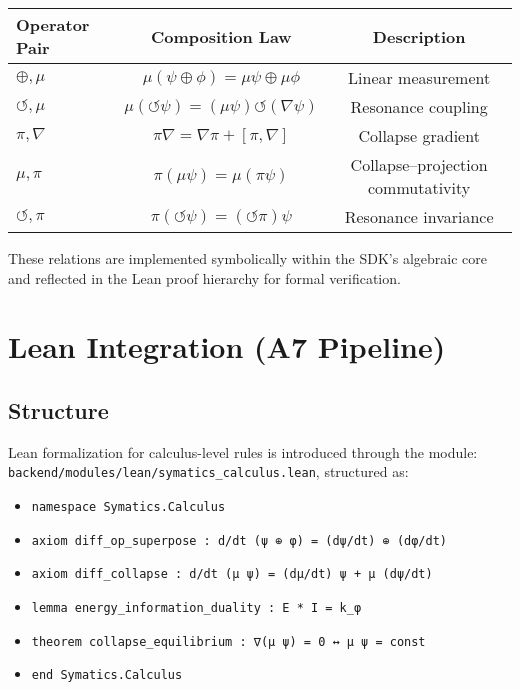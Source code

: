 \documentclass[12pt]{article}
\begin{document}
\begin{center}
\begin{tabular}{lcc}
\hline
Operator Pair & Composition Law & Description \\
\hline
$\oplus, \mu$ & $\mu(\psi \oplus \phi) = \mu\psi \oplus \mu\phi$ & Linear measurement \\
$\circlearrowleft, \mu$ & $\mu(\circlearrowleft \psi) = (\mu\psi) \circlearrowleft (\nabla\psi)$ & Resonance coupling \\
$\pi, \nabla$ & $\pi\nabla = \nabla\pi + [\pi,\nabla]$ & Collapse gradient \\
$\mu, \pi$ & $\pi(\mu\psi) = \mu(\pi\psi)$ & Collapse–projection commutativity \\
$\circlearrowleft, \pi$ & $\pi(\circlearrowleft\psi) = (\circlearrowleft\pi)\psi$ & Resonance invariance \\
\hline
\end{tabular}
\end{center}

These relations are implemented symbolically within the SDK’s algebraic core and reflected in the Lean proof hierarchy for formal verification.

\section{Lean Integration (A7 Pipeline)}

\subsection*{Structure}
Lean formalization for calculus-level rules is introduced through the module:
\texttt{backend/modules/lean/symatics\_calculus.lean}, structured as:

\begin{itemize}[noitemsep]
  \item \texttt{namespace Symatics.Calculus}
  \item \texttt{axiom diff\_op\_superpose : d/dt (ψ ⊕ φ) = (dψ/dt) ⊕ (dφ/dt)}
  \item \texttt{axiom diff\_collapse : d/dt (μ ψ) = (dμ/dt) ψ + μ (dψ/dt)}
  \item \texttt{lemma energy\_information\_duality : E * I = k\_φ}
  \item \texttt{theorem collapse\_equilibrium : ∇(μ ψ) = 0 ↔ μ ψ = const}
  \item \texttt{end Symatics.Calculus}
\end{itemize}
\end{document}
